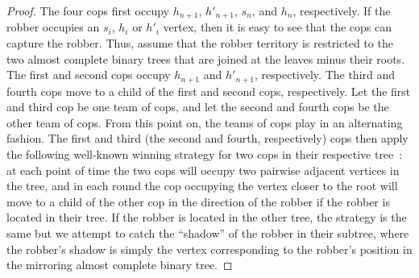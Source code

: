 \documentclass[letterpaper]{article} %
\begin{document}
\begin{proof}
The four cops first occupy $h_{n+1}$, $h'_{n+1}$, $s_n$, and $h_n$, respectively.
If the robber occupies an $s_i$, $h_i$ or $h'_i$ vertex, then it is easy to see that the cops can capture the robber.
Thus, assume that the robber territory is restricted to the two almost complete binary trees that are joined at the leaves minus their roots.
The first and second cops occupy $h_{n+1}$ and $h'_{n+1}$, respectively. The third and fourth cops move to a child of the first and second cops, respectively.
Let the first and third cop be one team of cops, and let the second and fourth cops be the other team of cops.
From this point on, the teams of cops play in an alternating fashion.
The first and third (the second and fourth, respectively) cops then apply the following well-known winning strategy for two cops in their respective tree~\cite{SeymourT93}: at each point of time the two cops will occupy two pairwise adjacent vertices in the tree, and in each round the cop occupying the vertex closer to the root will move to a child of the other cop in the direction of the robber if the robber is located in their tree. If the robber is located in the other tree, the strategy is the same but we attempt to catch the ``shadow'' of the robber in their subtree, where the robber's shadow is simply the vertex corresponding to the robber's position in the mirroring almost complete binary tree. 
\end{proof}
\end{document}
